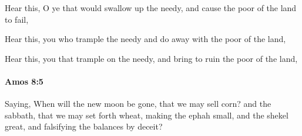 			\begin{versebox}
					\item[BHS] 
					\item[LXX] 
					\item[ASV] Hear this, O ye that would swallow up the needy, and cause the poor of the land to fail,
					\item[NIV] Hear this, you who trample the needy and do away with the poor of the land,
					\item[NRSV] Hear this, you that trample on the needy, and bring to ruin the poor of the land,
			\end{versebox}

		\paragraph{Amos 8:5} %
			\label{AMOS-8-5}

			Saying, When will the new moon be gone, that we may sell corn? and the sabbath, that we may set forth wheat, making the ephah small, and the shekel great, and falsifying the balances by deceit?

